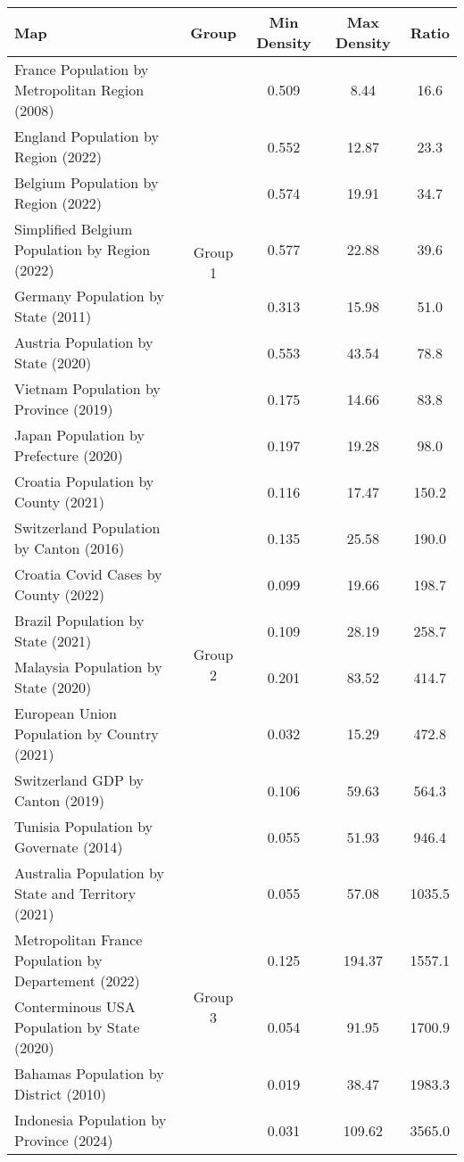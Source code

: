 \begin{tabular}{lcccc}
\toprule
Map & Group & Min Density & Max Density & Ratio \\
\midrule

France Population by Metropolitan Region (2008) & \multirow{8}{*}{Group 1} & 0.509 & 8.44 & 16.6 \\
England Population by Region (2022) &  & 0.552 & 12.87 & 23.3 \\
Belgium Population by Region (2022) &  & 0.574 & 19.91 & 34.7 \\
Simplified Belgium Population by Region (2022) &  & 0.577 & 22.88 & 39.6 \\
Germany Population by State (2011) &  & 0.313 & 15.98 & 51.0 \\
Austria Population by State (2020) &  & 0.553 & 43.54 & 78.8 \\
Vietnam Population by Province (2019) &  & 0.175 & 14.66 & 83.8 \\
Japan Population by Prefecture (2020) &  & 0.197 & 19.28 & 98.0 \\
\midrule
Croatia Population by County (2021) & \multirow{8}{*}{Group 2} & 0.116 & 17.47 & 150.2 \\
Switzerland Population by Canton (2016) &  & 0.135 & 25.58 & 190.0 \\
Croatia Covid Cases by County (2022) &  & 0.099 & 19.66 & 198.7 \\
Brazil Population by State (2021) &  & 0.109 & 28.19 & 258.7 \\
Malaysia Population by State (2020) &  & 0.201 & 83.52 & 414.7 \\
European Union Population by Country (2021) &  & 0.032 & 15.29 & 472.8 \\
Switzerland GDP by Canton (2019) &  & 0.106 & 59.63 & 564.3 \\
Tunisia Population by Governate (2014) &  & 0.055 & 51.93 & 946.4 \\
\midrule
Australia Population by State and Territory (2021) & \multirow{8}{*}{Group 3} & 0.055 & 57.08 & 1035.5 \\
Metropolitan France Population by Departement (2022) &  & 0.125 & 194.37 & 1557.1 \\
Conterminous USA Population by State (2020) &  & 0.054 & 91.95 & 1700.9 \\
Bahamas Population by District (2010) &  & 0.019 & 38.47 & 1983.3 \\
Indonesia Population by Province (2024) &  & 0.031 & 109.62 & 3565.0 \\

\end{tabular}
